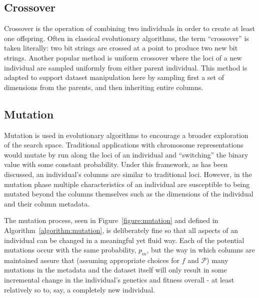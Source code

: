 \subsection{Crossover}

Crossover is the operation of combining two individuals in order to create at
least one offspring. Often in classical evolutionary algorithms, the term
``crossover'' is taken literally: two bit strings are crossed at a point
to produce two new bit strings. Another popular method is uniform crossover
where the loci of a new individual are sampled uniformly from either parent
individual. This method is adapted to support dataset manipulation here by
sampling first a set of dimensions from the parents, and then inheriting entire
columns.




\subsection{Mutation}

Mutation is used in evolutionary algorithms to encourage a broader exploration
of the search space. Traditional applications with chromosome representations
would mutate by run along the loci of an individual and ``switching'' the binary
value with some constant probability. Under this framework, as has been
discussed, an individual's columns are similar to traditional loci. However, in
the mutation phase multiple characteristics of an individual are susceptible to
being mutated beyond the columns themselves such as the dimensions of the
individual and their column metadata.


The mutation process, seen in Figure~\ref{figure:mutation} and defined in
Algorithm~\ref{algorithm:mutation},
is deliberately fine so that all aspects of an individual can be changed in a
meaningful yet fluid way. Each of the potential mutations occur with the same
probability, \(p_m\), but the way in which columns are maintained assure that
(assuming appropriate choices for \(f\) and \(\mathcal{P}\)) many mutations in
the metadata and the dataset itself will only result in some incremental change
in the individual's genetics and fitness overall \-- at least relatively so to,
say, a completely new individual.



